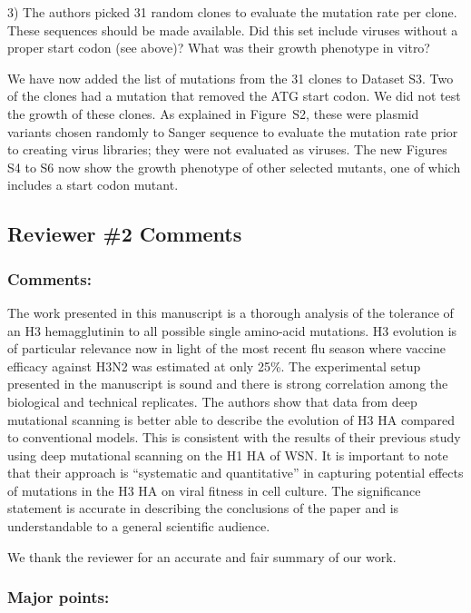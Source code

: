 \documentclass[11pt, oneside]{article}   	%
\newcommand{\response}[1]{{\color{black}#1}}
\begin{document}
3) The authors picked 31 random clones to evaluate the mutation rate per clone. These sequences should be made available. Did this set include viruses without a proper start codon (see above)? What was their growth phenotype in vitro? 

\response{We have now added the list of mutations from the 31 clones to Dataset S3.
Two of the clones had a mutation that removed the ATG start codon.
We did not test the growth of these clones. 
As explained in Figure~S2, these were plasmid variants chosen randomly to Sanger sequence to evaluate the mutation rate prior to creating virus libraries; they were not evaluated as viruses.
The new Figures S4 to S6 now show the growth phenotype of other selected mutants, one of which includes a start codon mutant.
}

\subsection*{Reviewer \#2 Comments} 

\subsubsection*{Comments:} 
The work presented in this manuscript is a thorough analysis of the tolerance of an H3 hemagglutinin to all possible single amino-acid mutations. H3 evolution is of particular relevance now in light of the most recent flu season where vaccine efficacy against H3N2 was estimated at only 25\%. The experimental setup presented in the manuscript is sound and there is strong correlation among the biological and technical replicates. The authors show that data from deep mutational scanning is better able to describe the evolution of H3 HA compared to conventional models. This is consistent with the results of their previous study using deep mutational scanning on the H1 HA of WSN. It is important to note that their approach is ``systematic and quantitative'' in capturing potential effects of mutations in the H3 HA on viral fitness in cell culture. The significance statement is accurate in describing the conclusions of the paper and is understandable to a general scientific audience. 

\response{We thank the reviewer for an accurate and fair summary of our work.}

\subsubsection*{Major points:} 
\end{document}

